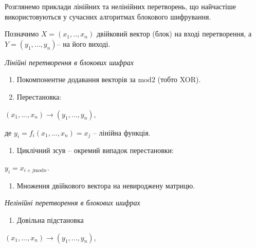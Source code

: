 \documentclass[a4paper]{article}
\newcounter{saveenum}
\newcommand\liststyleWWviiiNumiii{%
\renewcommand\theenumi{\arabic{enumi}}
\renewcommand\theenumii{\arabic{enumii}}
\renewcommand\theenumiii{\arabic{enumiii}}
\renewcommand\theenumiv{\arabic{enumiv}}
\renewcommand\labelenumi{\theenumi)}
\renewcommand\labelenumii{\theenumii.}
\renewcommand\labelenumiii{\theenumiii.}
\renewcommand\labelenumiv{\theenumiv.}
}
\newcommand\liststyleWWviiiNumxxxii{%
\renewcommand\theenumi{\arabic{enumi}}
\renewcommand\theenumii{\arabic{enumii}}
\renewcommand\theenumiii{\arabic{enumiii}}
\renewcommand\theenumiv{\arabic{enumiv}}
\renewcommand\labelenumi{\theenumi)}
\renewcommand\labelenumii{\theenumii.}
\renewcommand\labelenumiii{\theenumiii.}
\renewcommand\labelenumiv{\theenumiv.}
}
\newcounter{}
\begin{document}
Розглянемо приклади лінійних та нелінійних перетворень, що найчастіше
використовуються у сучасних алгоритмах блокового шифрування.

Позначимо  ${X=(x_{{1}},\text{.}\text{.},x_{{n}})}$ двійковий вектор (блок) на
вході перетворення, а   ${Y=(y_{{1}},\text{.}\text{.}\text{.},y_{{n}})}$– на
його виході.


\bigskip

{\centering\itshape
Лінійні перетворення в блокових шифрах
\par}


\bigskip

\liststyleWWviiiNumiii
\begin{enumerate}
\item Покомпонентне додавання векторів за  ${\text{mod}2}$ (тобто XOR).
\item Перестановка:
\end{enumerate}
{\centering
 ${(x_{{1}},\text{.}\text{.}\text{.},x_{{n}})\rightarrow
(y_{{1}},\text{.}\text{.}\text{.},y_{{n}})}$,
\par}

де  ${y_{{i}}=f_{{i}}(x_{{1}},\text{.}\text{.}\text{.},x_{{n}})=x_{{j}}}$ –
лінійна функція.

\liststyleWWviiiNumiii
\setcounter{saveenum}{\value{enumi}}
\begin{enumerate}
\setcounter{enumi}{\value{saveenum}}
\item Циклічний зсув  –  окремий випадок перестановки:
\end{enumerate}
{\centering\itshape
 ${y_{{i}}=x_{{i+j\text{mod}n}}}$.
\par}

\liststyleWWviiiNumiii
\setcounter{saveenum}{\value{enumi}}
\begin{enumerate}
\setcounter{enumi}{\value{saveenum}}
\item Множення двійкового вектора на невироджену матрицю.
\end{enumerate}

\bigskip


\bigskip


\bigskip


\bigskip

{\centering\itshape
Нелінійні перетворення в блокових шифрах
\par}


\bigskip

\liststyleWWviiiNumxxxii
\begin{enumerate}
\item Довільна підстановка
\end{enumerate}
{\centering
 ${(x_{{1}},\text{.}\text{.}\text{.},x_{{n}})\rightarrow
(y_{{1}},\text{.}\text{.}\text{.},y_{{n}})}$,
\par}
\end{document}
